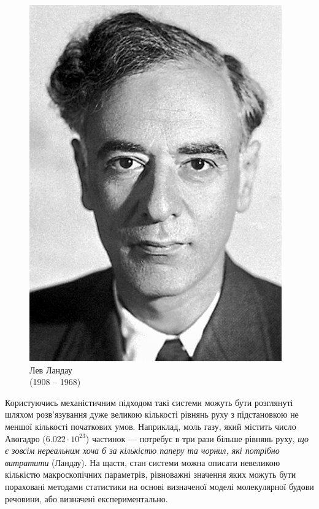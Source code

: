 \begin{figure}
\includegraphics[width=\linewidth]{Lec1/Landau}
\caption*{Лев Ландау\\(1908 -- 1968)}
\end{figure}
Користуючись механістичним підходом такі системи можуть бути розглянуті шляхом розв'язування дуже великою кількості рівнянь руху з підстановкою не меншої кількості початкових умов. Наприклад, моль газу, який містить число Авогадро ($ 6.022\cdot10^{23} $) частинок --- потребує в три рази більше рівнянь руху, \emph{що є зовсім нереальним хоча б за кількістю паперу та чорнил, які потрібно витратити} (Ландау). На щастя, стан системи можна описати невеликою кількістю макроскопічних параметрів, рівноважні значення яких можуть бути пораховані методами статистики на основі визначеної моделі молекулярної будови речовини, або визначені експериментально.


